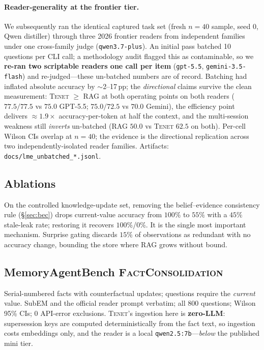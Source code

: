\documentclass[11pt]{article}
\newcommand{\tenet}{\textsc{Tenet}}
\begin{document}
\paragraph{Reader-generality at the frontier tier.} We subsequently ran the identical
captured task set (fresh $n{=}40$ sample, seed 0, Qwen distiller) through three 2026
frontier readers from independent families under one cross-family judge
(\texttt{qwen3.7-plus}). An initial pass batched 10 questions per CLI call; a methodology
audit flagged this as contaminable, so we \textbf{re-ran two scriptable readers one call
per item} (\texttt{gpt-5.5}, \texttt{gemini-3.5-flash}) and re-judged---these un-batched
numbers are of record. Batching had inflated absolute accuracy by $\sim$2--17\,pp; the
\emph{directional} claims survive the clean measurement: \tenet{} $\ge$ RAG at both
operating points on both readers ($77.5/77.5$ vs $75.0$ GPT-5.5; $75.0/72.5$ vs $70.0$
Gemini), the efficiency point delivers $\approx 1.9\times$ accuracy-per-token at half the
context, and the multi-session weakness still \emph{inverts} un-batched (RAG $50.0$ vs
\tenet{} $62.5$ on both). Per-cell Wilson CIs overlap at $n{=}40$; the evidence is the
directional replication across two independently-isolated reader families.
Artifacts: \texttt{docs/lme\_unbatched\_*.jsonl}.

\subsection{Ablations}\label{sec:ablation}
On the controlled knowledge-update set, removing the belief--evidence consistency rule
(\S\ref{sec:bec}) drops current-value accuracy from $100\%$ to $55\%$ with a $45\%$
stale-leak rate; restoring it recovers $100\%$/0\%. It is the single most important
mechanism. Surprise gating discards $15\%$ of observations as redundant with no accuracy
change, bounding the store where RAG grows without bound.

\subsection{MemoryAgentBench \textsc{FactConsolidation}}\label{sec:fc}
Serial-numbered facts with counterfactual updates; questions require the \emph{current}
value. SubEM and the official reader prompt verbatim; all 800 questions; Wilson 95\% CIs;
0 API-error exclusions. \tenet{}'s ingestion here is \textbf{zero-LLM}: supersession keys
are computed deterministically from the fact text, so ingestion costs embeddings only, and
the reader is a local \texttt{qwen2.5:7b}---\emph{below} the published mini tier.
\end{document}
